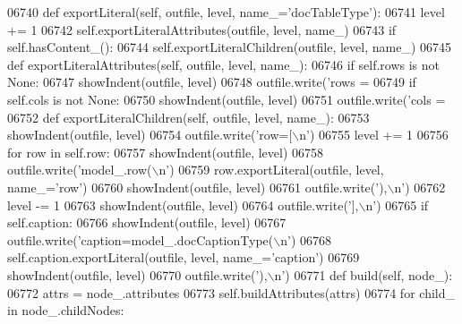 \begin{DoxyCode}
{{{{{{{{{{{{{{{{{{{{{{{{{{{{{{{{{{{{{{{{{{{{{{{{{{{{{{{{{{{{{{{{{{{{{{{{{{{{{{{{{{{{{{{{{{{{{{{{{{{{{{{{{{{{{{{{{{{{{{{{{{{{{{{{{{{{{{{{{{{{{{{{{{{{{{{{{{{{{{{{{{{{{{{{{{{{{{{{{{{{{{{{{{{{{{{{{{{{{{{{{{{{{{{{{{{{{{{{{{{{{{{{{{{{{{{{{{{{{{{{{{{{{{{{{{{{{{{{{{{{{{{{{{{{{{{{{{{{{{{{{{{{{{{{{{{{{{{{{{{{{{{{{{{{{{{{{{{{{{{{{{{{{{{{{{{{{{{{{{{{{{{{{{{{{{{{{{{{{{{{{{{{{{{{{{{{{{{{{{{{{{{{{{{{{{{{{{{{{{{{{{{{{{{{{{{{{{{{{{06740     \textcolor{keyword}{def }exportLiteral(self, outfile, level, name\_='docTableType'):
06741         level += 1
06742         self.exportLiteralAttributes(outfile, level, name\_)
06743         \textcolor{keywordflow}{if} self.hasContent_():
06744             self.exportLiteralChildren(outfile, level, name\_)
06745     \textcolor{keyword}{def }exportLiteralAttributes(self, outfile, level, name\_):
06746         \textcolor{keywordflow}{if} self.rows \textcolor{keywordflow}{is} \textcolor{keywordflow}{not} \textcolor{keywordtype}{None}:
06747             showIndent(outfile, level)
06748             outfile.write(\textcolor{stringliteral}{'rows = %
06749         \textcolor{keywordflow}{if} self.cols \textcolor{keywordflow}{is} \textcolor{keywordflow}{not} \textcolor{keywordtype}{None}:
06750             showIndent(outfile, level)
06751             outfile.write(\textcolor{stringliteral}{'cols = %
06752     \textcolor{keyword}{def }exportLiteralChildren(self, outfile, level, name\_):
06753         showIndent(outfile, level)
06754         outfile.write(\textcolor{stringliteral}{'row=[\(\backslash\)n'})
06755         level += 1
06756         \textcolor{keywordflow}{for} row \textcolor{keywordflow}{in} self.row:
06757             showIndent(outfile, level)
06758             outfile.write(\textcolor{stringliteral}{'model\_.row(\(\backslash\)n'})
06759             row.exportLiteral(outfile, level, name\_=\textcolor{stringliteral}{'row'})
06760             showIndent(outfile, level)
06761             outfile.write(\textcolor{stringliteral}{'),\(\backslash\)n'})
06762         level -= 1
06763         showIndent(outfile, level)
06764         outfile.write(\textcolor{stringliteral}{'],\(\backslash\)n'})
06765         \textcolor{keywordflow}{if} self.caption:
06766             showIndent(outfile, level)
06767             outfile.write(\textcolor{stringliteral}{'caption=model\_.docCaptionType(\(\backslash\)n'})
06768             self.caption.exportLiteral(outfile, level, name\_=\textcolor{stringliteral}{'caption'})
06769             showIndent(outfile, level)
06770             outfile.write(\textcolor{stringliteral}{'),\(\backslash\)n'})
06771     \textcolor{keyword}{def }build(self, node\_):
06772         attrs = node\_.attributes
06773         self.buildAttributes(attrs)
06774         \textcolor{keywordflow}{for} child\_ \textcolor{keywordflow}{in} node\_.childNodes:
}}}}}}}}}}}}}}}}}}}}}}}}}}}}}}}}}}}}}}}}}}}}}}}}}}}}}}}}}}}}}}}}}}}}}}}}}}}}}}}}}}}}}}}}}}}}}}}}}}}}}}}}}}}}}}}}}}}}}}}}}}}}}}}}}}}}}}}}}}}}}}}}}}}}}}}}}}}}}}}}}}}}}}}}}}}}}}}}}}}}}}}}}}}}}}}}}}}}}}}}}}}}}}}}}}}}}}}}}}}}}}}}}}}}}}}}}}}}}}}}}}}}}}}}}}}}}}}}}}}}}}}}}}}}}}}}}}}}}}}}}}}}}}}}}}}}}}}}}}}}}}}}}}}}}}}}}}}}}}}}}}}}}}}}}}}}}}}}}}}}}}}}}}}}}}}}}}}}}}}}}}}}}}}}}}}}}}}}}}}}}}}}}}}}}}}}}}}}}}}}}}}}}}}}}}}}}}}}}}}}
\end{DoxyCode}
